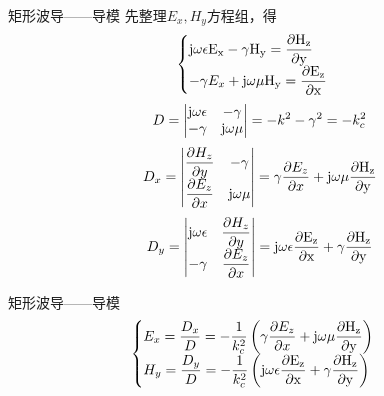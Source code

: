 \begin{frame}{矩形波导——导模}
    先整理$E_x,H_y$方程组，得
    \begin{align*}
        \begin{cases}
            \rm{j}\omega\epsilon E_x-\gamma H_y=\dfrac{\partial H_z}{\partial y} \\
            -\gamma E_x+\rm{j}\omega\mu H_y=\dfrac{\partial E_z}{\partial x}     \\
        \end{cases}
    \end{align*}
    \begin{align*}
        D=
        \begin{vmatrix}
            \rm{j}\omega\epsilon & -\gamma         \\
            -\gamma              & \rm{j}\omega\mu \\
        \end{vmatrix}
        =-k^2-\gamma^2=-k_c^2
    \end{align*}
    \begin{align*}
        D_x=
        \begin{vmatrix}
            \dfrac{\partial H_z}{\partial y} & -\gamma         \\
            \dfrac{\partial E_z}{\partial x} & \rm{j}\omega\mu \\
        \end{vmatrix}
        =\gamma\frac{\partial E_z}{\partial x}+\rm{j}\omega\mu\frac{\partial H_z}{\partial y}
    \end{align*}
    \begin{align*}
        D_y=
        \begin{vmatrix}
            \rm{j}\omega\epsilon & \dfrac{\partial H_z}{\partial y} \\
            -\gamma              & \dfrac{\partial E_z}{\partial x} \\
        \end{vmatrix}
        =\rm{j}\omega\epsilon\frac{\partial E_z}{\partial x}+\gamma \frac{\partial H_z}{\partial y}
    \end{align*}
\end{frame}

\begin{frame}{矩形波导——导模}
    \begin{align}
        \begin{cases}
            E_x=\dfrac{D_x}{D}=-\dfrac{1}{k_c^2}\left(\gamma\dfrac{\partial E_z}{\partial x}+\rm{j}\omega\mu\dfrac{\partial H_z}{\partial y}\right) \\
            H_y=\dfrac{D_y}{D}=-\dfrac{1}{k_c^2}\left(\rm{j}\omega\epsilon\dfrac{\partial E_z}{\partial x}+\gamma\dfrac{\partial H_z}{\partial y}\right)
        \end{cases}
        \label{eqn6-13}
    \end{align}
\end{frame}

